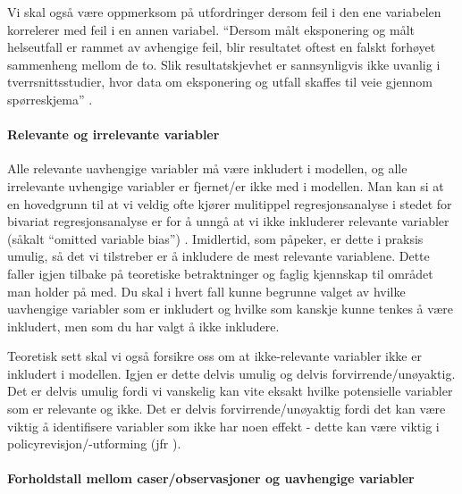 \documentclass[
]{article}
\begin{document}
Vi skal også være oppmerksom på utfordringer dersom feil i den ene variabelen korrelerer med feil i en annen variabel. ``Dersom målt eksponering og målt helseutfall er rammet av avhengige feil, blir resultatet oftest en falskt forhøyet sammenheng mellom de to. Slik resultatskjevhet er sannsynligvis ikke uvanlig i tverrsnittsstudier, hvor data om eksponering og utfall skaffes til veie gjennom spørreskjema'' \citep{kristensenAvhengigeMalefeilObservasjonsstudier2005}.

\hypertarget{relevante-og-irrelevante-variabler}{%
\paragraph{Relevante og irrelevante variabler}\label{relevante-og-irrelevante-variabler}}

Alle relevante uavhengige variabler må være inkludert i modellen, og alle irrelevante uvhengige variabler er fjernet/er ikke med i modellen. Man kan si at en hovedgrunn til at vi veldig ofte kjører mulitippel regresjonsanalyse i stedet for bivariat regresjonsanalyse er for å unngå at vi ikke inkluderer relevante variabler (såkalt ``omitted variable bias'') \citep{thraneAppliedRegressionAnalysis2019}. Imidlertid, som \citet{thraneAppliedRegressionAnalysis2019} påpeker, er dette i praksis umulig, så det vi tilstreber er å inkludere de mest relevante variablene. Dette faller igjen tilbake på teoretiske betraktninger og faglig kjennskap til området man holder på med. Du skal i hvert fall kunne begrunne valget av hvilke uavhengige variabler som er inkludert og hvilke som kanskje kunne tenkes å være inkludert, men som du har valgt å ikke inkludere.

Teoretisk sett skal vi også forsikre oss om at ikke-relevante variabler ikke er inkludert i modellen. Igjen er dette delvis umulig og delvis forvirrende/unøyaktig. Det er delvis umulig fordi vi vanskelig kan vite eksakt hvilke potensielle variabler som er relevante og ikke. Det er delvis forvirrende/unøyaktig fordi det kan være viktig å identifisere variabler som ikke har noen effekt - dette kan være viktig i policyrevisjon/-utforming (jfr \citet{thraneAppliedRegressionAnalysis2019}).

\hypertarget{forholdstall-mellom-caserobservasjoner-og-uavhengige-variabler}{%
\paragraph{Forholdstall mellom caser/observasjoner og uavhengige variabler}\label{forholdstall-mellom-caserobservasjoner-og-uavhengige-variabler}}
\end{document}
